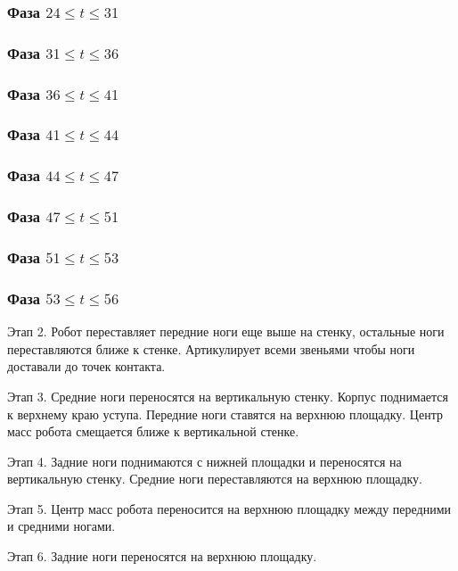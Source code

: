 \subsubsection{Фаза $24 \leq t \leq 31$}

\subsubsection{Фаза $31 \leq t \leq 36$}

\subsubsection{Фаза $36 \leq t \leq 41$}

\subsubsection{Фаза $41 \leq t \leq 44$}

\subsubsection{Фаза $44 \leq t \leq 47$}

\subsubsection{Фаза $47 \leq t \leq 51$}

\subsubsection{Фаза $51 \leq t \leq 53$}

\subsubsection{Фаза $53 \leq t \leq 56$}

Этап 2. Робот переставляет передние ноги еще выше на стенку, остальные ноги переставляются ближе к стенке. Артикулирует всеми звеньями чтобы ноги доставали до точек контакта.

Этап 3. Средние ноги переносятся на вертикальную стенку. Корпус поднимается к верхнему краю уступа. Передние ноги ставятся на верхнюю площадку. Центр масс робота смещается ближе к вертикальной стенке.

Этап 4. Задние ноги поднимаются с нижней площадки и переносятся на вертикальную стенку. Средние ноги переставляются на верхнюю площадку.

Этап 5. Центр масс робота переносится на верхнюю площадку между передними и средними ногами.

Этап 6. Задние ноги переносятся на верхнюю площадку.